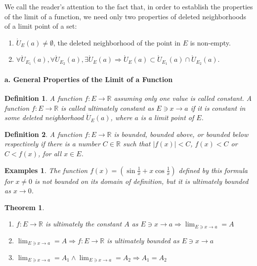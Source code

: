 \documentclass[a4paper,12pt]{article} %
\newtheorem{definition}{Definition}[section]
\newtheorem{theorem}{Theorem}[section]
\newtheorem{example}{Examples}
\begin{document}
We call the reader's attention to the fact that, in order to establish 
the properties of the limit of a function, we need only two properties 
of deleted neighborhoods of a limit point of a set:

\begin{enumerate}
    \item $\displaystyle \mathring{U}_E(a) \ne \emptyset$, the deleted neighborhood 
    of the point in $E$ is non-empty.
\item $\displaystyle \forall\mathring{U}_{E_1}(a), \forall\mathring{U}_{E_2}(a),
        \exists\mathring{U}_E(a) \Rightarrow \mathring{U}_E(a) \subset 
        \mathring{U}_{E_1}(a) \cap \mathring{U}_{E_2}(a).$
\end{enumerate}

\paragraph{{\rm \textbf{a. General Properties of the Limit of a Function}}}
\begin{definition}
    A function $f: E \to \mathbb{R}$ assuming only one value is called constant.
    A function $f: E \to \mathbb{R}$ is called ultimately constant as 
    $E \ni x \to a$ if it is constant in some deleted neighborhood $\displaystyle 
    \mathring{U}_E(a)$, where $a$ is a limit point of $E$.
\end{definition}

\begin{definition}
    A function $f: E \to \mathbb{R}$ is bounded, bounded above, or bounded 
    below respectively if there is a number $C \in \mathbb{R}$ such that 
    $\displaystyle \left|f(x)\right| < C$, $f(x) < C$ or $C < f(x)$, for all 
    $x \in E$.
\end{definition}

\begin{example}
    The function $\displaystyle f(x) = \left(\sin \frac{1}{x} + x \cos \frac{1}{x}\right)$
    defined by this formula for $x \ne 0$ is not bounded on its domain of 
    definition, but it is ultimately bounded as $x \to 0$.
\end{example}

\begin{theorem}
    \begin{enumerate}
        \item $f: E \to \mathbb{R}$ is ultimately the constant $A$ as 
            $ \displaystyle E \ni 
            x \to a \Rightarrow \lim_{E \ni x \to a} = A$
        \item $ \displaystyle \lim_{E \ni x \to a} = A \Rightarrow 
            f: E \to \mathbb{R}$ is ultimately bounded as $E \ni x \to a$
        \item $ \displaystyle \lim_{E \ni x \to a} = A_1 \wedge  
            \lim_{E \ni x \to a} = A_2 \Rightarrow A_1 = A_2 $
    \end{enumerate}
\end{theorem}
\end{document}
